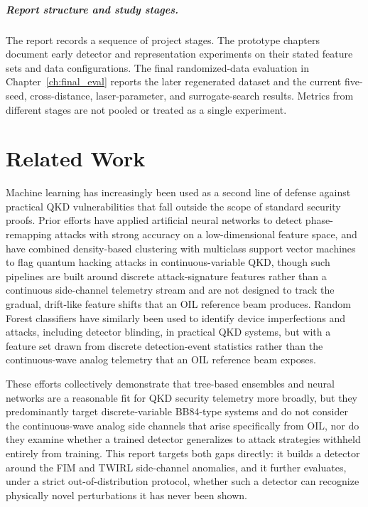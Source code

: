 \documentclass[12pt, a4paper]{report}
\begin{document}

\paragraph{Report structure and study stages.} The report records a sequence of project stages. The prototype chapters document early detector and representation experiments on their stated feature sets and data configurations. The final randomized-data evaluation in Chapter~\ref{ch:final_eval} reports the later regenerated dataset and the current five-seed, cross-distance, laser-parameter, and surrogate-search results. Metrics from different stages are not pooled or treated as a single experiment.
\chapter{Related Work}

Machine learning has increasingly been used as a second line of defense against practical QKD vulnerabilities that fall outside the scope of standard security proofs. Prior efforts have applied artificial neural networks to detect phase-remapping attacks with strong accuracy on a low-dimensional feature space, and have combined density-based clustering with multiclass support vector machines to flag quantum hacking attacks in continuous-variable QKD, though such pipelines are built around discrete attack-signature features rather than a continuous side-channel telemetry stream and are not designed to track the gradual, drift-like feature shifts that an OIL reference beam produces. Random Forest classifiers have similarly been used to identify device imperfections and attacks, including detector blinding, in practical QKD systems, but with a feature set drawn from discrete detection-event statistics rather than the continuous-wave analog telemetry that an OIL reference beam exposes.

These efforts collectively demonstrate that tree-based ensembles and neural networks are a reasonable fit for QKD security telemetry more broadly, but they predominantly target discrete-variable BB84-type systems and do not consider the continuous-wave analog side channels that arise specifically from OIL, nor do they examine whether a trained detector generalizes to attack strategies withheld entirely from training. This report targets both gaps directly: it builds a detector around the FIM and TWIRL side-channel anomalies, and it further evaluates, under a strict out-of-distribution protocol, whether such a detector can recognize physically novel perturbations it has never been shown.
\end{document}
